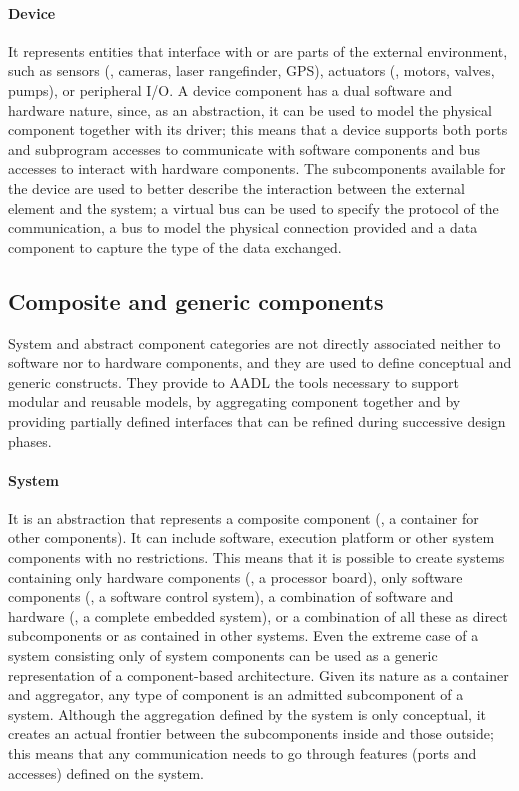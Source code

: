 \paragraph{Device} It represents entities that interface with or are parts of the external environment, such as sensors (\eg, cameras, laser rangefinder, GPS), actuators (\eg, motors, valves, pumps), or peripheral I/O. A device component has a dual software and hardware nature, since, as an abstraction, it can be used to model the physical component together with its driver; this means that a device supports both ports and subprogram accesses to communicate with software components and bus accesses to interact with hardware components. The subcomponents available for the device are used to better describe the interaction between the external element and the system; a virtual bus can be used to specify the protocol of the communication, a bus to model the physical connection provided and a data component to capture the type of the data exchanged.

\subsection[Composite and generic components]{Composite and generic components}
System and abstract component categories are not directly associated neither to software nor to hardware components, and they are used to define conceptual and generic constructs. They provide to AADL the tools necessary to support modular and reusable models, by aggregating component together and by providing partially defined interfaces that can be refined during successive design phases.

\paragraph{System} It is an abstraction that represents a composite component (\ie, a container for other components). It can include software, execution platform or other system components with no restrictions. This means that it is possible to create systems containing only hardware components (\eg, a processor board), only software components (\eg, a software control system), a combination of software and hardware (\eg, a complete embedded system),  or a combination of all these as direct subcomponents or as contained in other systems. Even the extreme case of a system consisting only of system components can be used as a generic representation of a component-based architecture. Given its nature as a container and aggregator, any type of component is an admitted subcomponent of a system. Although the aggregation defined by the system is only conceptual, it creates an actual frontier between the subcomponents inside and those outside; this means that any communication needs to go through features (\ie ports and accesses) defined on the system.


